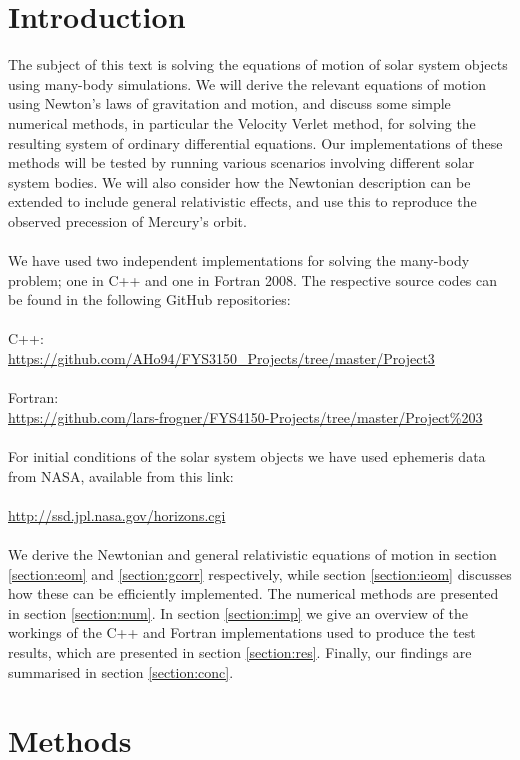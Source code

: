 \documentclass{article}
\begin{document}
\section{Introduction} \label{section:intr}
The subject of this text is solving the equations of motion of solar system objects using many-body simulations. We will derive the relevant equations of motion using Newton's laws of gravitation and motion, and discuss some simple numerical methods, in particular the Velocity Verlet method, for solving the resulting system of ordinary differential equations. Our implementations of these methods will be tested by running various scenarios involving different solar system bodies. We will also consider how the Newtonian description can be extended to include general relativistic effects, and use this to reproduce the observed precession of Mercury's orbit. \\\\
We have used two independent implementations for solving the many-body problem; one in C++ and one in Fortran 2008. The respective source codes can be found in the following GitHub repositories:\\\\
C++:\\\url{https://github.com/AHo94/FYS3150_Projects/tree/master/Project3}\\\\
Fortran:\\\url{https://github.com/lars-frogner/FYS4150-Projects/tree/master/Project%203}\\\\
For initial conditions of the solar system objects we have used ephemeris data from NASA, available from this link: \\\\
\url{http://ssd.jpl.nasa.gov/horizons.cgi}\\\\
We derive the Newtonian and general relativistic equations of motion in section \ref{section:eom} and \ref{section:gcorr} respectively, while section \ref{section:ieom} discusses how these can be efficiently implemented. The numerical methods are presented in section \ref{section:num}. In section \ref{section:imp} we give an overview of the workings of the C++ and Fortran implementations used to produce the test results, which are presented in section \ref{section:res}. Finally, our findings are summarised in section \ref{section:conc}.

\section{Methods} \label{section:met}
\end{document}
